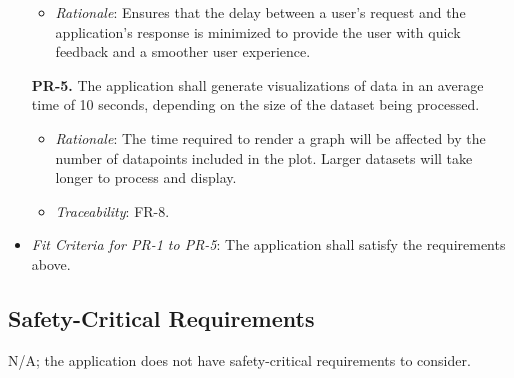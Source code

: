 \documentclass[12pt]{article}
\begin{document}
\begin{enumerate}
\begin{itemize}
    \item \textit{Rationale}: Ensures that the delay between a user's request and the application's response is minimized to provide the user with quick feedback and a smoother user experience.
  \end{itemize}
\item[\textbf{PR-5.}] The application shall generate visualizations of data in an average time of 10 seconds, depending on the size of the dataset being processed.
  \begin{itemize}
    \item \textit{Rationale}: The time required to render a graph will be affected by the number of datapoints included in the plot. Larger datasets will take longer to process and display.
    \item \textit{Traceability}: FR-8.
  \end{itemize}
\end{enumerate}
\begin{itemize}
  \item \textit{Fit Criteria for PR-1 to PR-5}: The application shall satisfy the requirements above.
\end{itemize}

\subsection{Safety-Critical Requirements}
N/A; the application does not have safety-critical requirements to consider.
\end{document}
